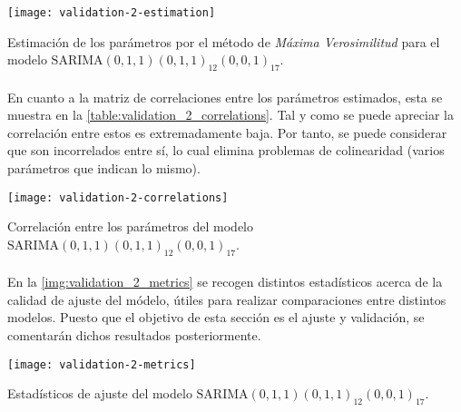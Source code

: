 \documentclass[a4paper, spanish]{article}
\begin{document}
      \begin{table}[htb!]
        \centering
        \texttt{[image: validation-2-estimation]}
        \caption{Estimación de los parámetros por el método de \emph{Máxima Verosimilitud} para el modelo $\text{SARIMA}(0, 1, 1)(0, 1, 1)_{12}(0, 0, 1)_{17}$.}
        \label{table:validation_2_estimation}
      \end{table}

      \paragraph{}
      En cuanto a la matriz de correlaciones entre los parámetros estimados, esta se muestra en la \autoref{table:validation_2_correlations}. Tal y como se puede apreciar la correlación entre estos es extremadamente baja. Por tanto, se puede considerar que son incorrelados entre sí, lo cual elimina problemas de colinearidad (varios parámetros que indican lo mismo).

      \begin{table}[htb!]
        \centering
        \texttt{[image: validation-2-correlations]}
        \caption{Correlación entre los parámetros del modelo $\text{SARIMA}(0, 1, 1)(0, 1, 1)_{12}(0, 0, 1)_{17}$.}
        \label{table:validation_2_correlations}
      \end{table}

      \paragraph{}
      En la \autoref{img:validation_2_metrics} se recogen distintos estadísticos acerca de la calidad de ajuste del módelo, útiles para realizar comparaciones entre distintos modelos. Puesto que el objetivo de esta sección es el ajuste y validación, se comentarán dichos resultados posteriormente.

      \begin{table}[htb!]
        \centering
        \texttt{[image: validation-2-metrics]}
        \caption{Estadísticos de ajuste del modelo $\text{SARIMA}(0, 1, 1)(0, 1, 1)_{12}(0, 0, 1)_{17}$.}
        \label{img:validation_2_metrics}
      \end{table}
\end{document}
